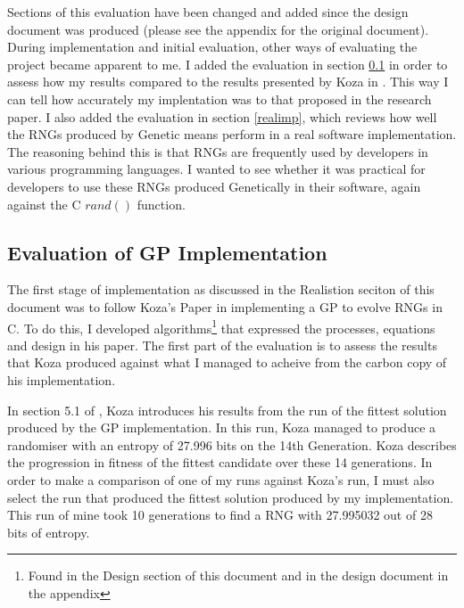 \documentclass[a4paper,10.5pt]{article}
\begin{document}
Sections of this evaluation have been changed and added since the design document was produced (please see the appendix for the original document). During implementation and initial evaluation, other ways of evaluating the project became apparent to me. I added the evaluation in section \ref{evalofgp} in order to assess how my results compared to the results presented by Koza in \cite{kozarng}. This way I can tell how accurately my implentation was to that proposed in the research paper. I also added the evaluation in section \ref{realimp}, which reviews how well the RNGs produced by Genetic means perform in a real software implementation. The reasoning behind this is that RNGs are frequently used by developers in various programming languages. I wanted to see whether it was practical for developers to use these RNGs produced Genetically in their software, again against the C $rand()$ function.

\subsection{Evaluation of GP Implementation}
 \label{evalofgp}
The first stage of implementation as discussed in the Realistion seciton of this document was to follow Koza's Paper \cite{kozarng} in implementing a GP to evolve RNGs in C. To do this, I developed algorithms\footnote{Found in the Design section of this document and in the design document in the appendix} that expressed the processes, equations and design in his paper. The first part of the evaluation is to assess the results that Koza produced against what I managed to acheive from the carbon copy of his implementation.

In section 5.1 of \cite[p. 6]{kozarng}, Koza introduces his results from the run of the fittest solution produced by the GP implementation. In this run, Koza managed to produce a randomiser with an entropy of 27.996 bits on the 14th Generation. Koza describes the progression in fitness of the fittest candidate over these 14 generations. In order to make a comparison of one of my runs against Koza's run, I must also select the run that produced the fittest solution produced by my implementation. This run of mine took 10 generations to find a RNG with 27.995032 out of 28 bits of entropy.
\end{document}

